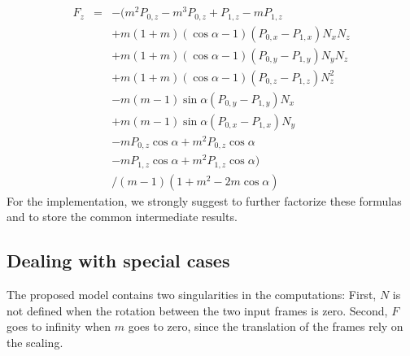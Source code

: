 \documentclass[tikz, journal, letterpaper]{IEEEtran}
\begin{document}
\begin{equation}
\begin{array}{lcl}
 F_z &=& -(m^2 P_{0,z} - m^3 P_{0,z} + P_{1,z} - m P_{1,z} \\
		&& + m (1+m) (\cos\alpha - 1) (P_{0,x} - P_{1,x}) N_x N_z \\
		&& + m (1+m) (\cos\alpha - 1) (P_{0,y} - P_{1,y}) N_y N_z \\
		&& + m (1+m) (\cos\alpha - 1) (P_{0,z} - P_{1,z}) N_z^2 \\
		&& - m (m-1) \sin\alpha (P_{0,y} - P_{1,y}) N_x \\
		&& + m (m-1) \sin\alpha (P_{0,x} - P_{1,x}) N_y \\
		&& - m P_{0,z} \cos\alpha + m^2 P_{0,z} \cos\alpha \\
		&& - m P_{1,z} \cos\alpha + m^2 P_{1,z} \cos\alpha) \\
		&& / (m-1)(1 + m^2 - 2m\cos\alpha)
\end{array}
\label{eq:Fz}
\end{equation}
For the implementation, we strongly suggest to further factorize these formulas and to store the common intermediate results.

\subsection{Dealing with special cases}
The proposed model contains two singularities in the computations: 
First, $N$ is not defined when the rotation between the two input frames is zero.
Second, $F$ goes to infinity when $m$ goes to zero, since the translation of the frames rely on the scaling.
\end{document}
